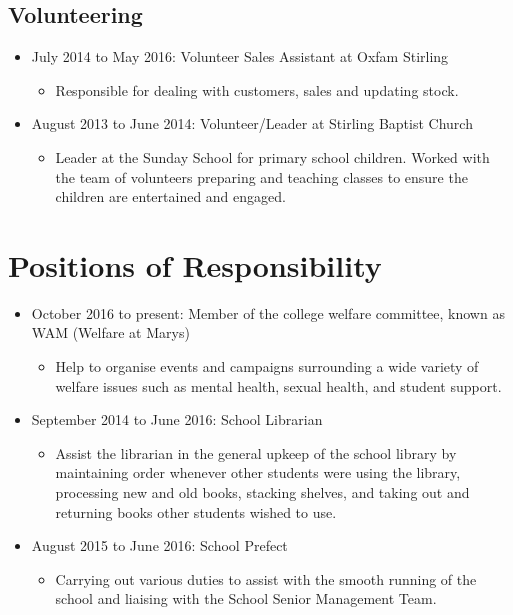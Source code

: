 \documentclass[10pt, a4paper]{article}
\begin{document}
	\subsection{Volunteering}
	\begin{itemize}
		\item July 2014 to May 2016: Volunteer Sales Assistant at Oxfam Stirling
		\begin{itemize}
			\item Responsible for dealing with customers, sales and updating stock.
		\end{itemize}
		\item August 2013 to June 2014: Volunteer/Leader at Stirling Baptist Church
		\begin{itemize}
			\item Leader at the Sunday School for primary school children. Worked with the team of volunteers preparing and teaching classes to ensure the children are entertained and engaged.
		\end{itemize}
	\end{itemize}

\section{Positions of Responsibility}
\begin{itemize}
	\item October 2016 to present: Member of the college welfare committee, known as WAM (Welfare at Mary\textquotesingle s)
	\begin{itemize}
		\item Help to organise events and campaigns surrounding a wide variety of welfare issues such as mental health, sexual health, and student support.
	\end{itemize}
	\item September 2014 to June 2016: School Librarian
	\begin{itemize}
		\item Assist the librarian in the general upkeep of the school library by maintaining order whenever other students were using the library, processing new and old books, stacking shelves, and taking out and returning books other students wished to use.
	\end{itemize}
	\item August 2015 to June 2016: School Prefect
	\begin{itemize}
		\item Carrying out various duties to assist with the smooth running of the school and liaising with the School Senior Management Team.
	\end{itemize}
\end{itemize}
\end{document}
